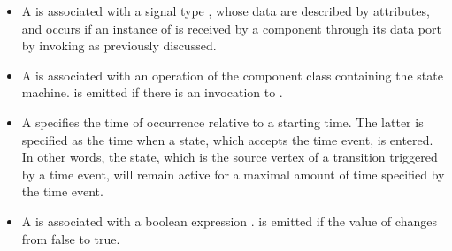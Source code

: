 \begin{itemize}[\footnotesize]
	\itemsep0em
	\item A  is associated with a signal type , whose data are described by attributes, and occurs if an instance of  is received by a component through its data port by invoking  as previously discussed. 
	
	\item A  is associated with an operation  of the component class containing the state machine. 
	 is emitted if there is an invocation to .
	
	\item A  specifies the time of occurrence  relative to a starting time. 
	The latter is specified as the time when a state, which accepts the time event, is entered.
	In other words, the state, which is the source vertex of a transition triggered by a time event, will remain active for a maximal amount of time specified by the time event.
	
	\item A  is associated with a boolean expression . 
	 is emitted if the value of  changes from false to true.
\end{itemize}

